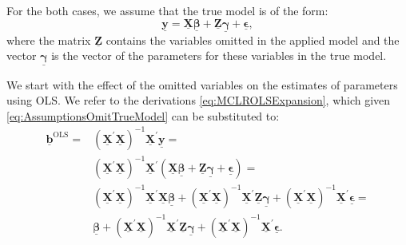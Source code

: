 \documentclass[
]{book}
\begin{document}
For the both cases, we assume that the true model is of the form:
\begin{equation}
    \underline{\mathbf{y}} = \underline{\mathbf{X}} \underline{\boldsymbol{\beta}} + \underline{\mathbf{Z}} \underline{\boldsymbol{\gamma}} + \underline{\boldsymbol{\epsilon}},
    \label{eq:AssumptionsOmitTrueModel}
\end{equation}
where the matrix \(\underline{\mathbf{Z}}\) contains the variables omitted in the applied model and the vector \(\underline{\boldsymbol{\gamma}}\) is the vector of the parameters for these variables in the true model.

We start with the effect of the omitted variables on the estimates of parameters using OLS. We refer to the derivations \eqref{eq:MCLROLSExpansion}, which given \eqref{eq:AssumptionsOmitTrueModel} can be substituted to:
\begin{equation}
    \begin{aligned}
    \underline{\boldsymbol{b}}^{\text{OLS}} =
        & \left( \underline{\mathbf{X}}^\prime \underline{\mathbf{X}} \right)^{-1} \underline{\mathbf{X}}^\prime \underline{\mathbf{y}} = \\
        & \left( \underline{\mathbf{X}}^\prime \underline{\mathbf{X}} \right)^{-1} \underline{\mathbf{X}}^\prime \left(\underline{\mathbf{X}} \underline{\boldsymbol{\beta}} + \underline{\mathbf{Z}} \underline{\boldsymbol{\gamma}} + \underline{\boldsymbol{\epsilon}} \right) = \\
        & \left( \underline{\mathbf{X}}^\prime \underline{\mathbf{X}} \right)^{-1} \underline{\mathbf{X}}^\prime \underline{\mathbf{X}} \underline{\boldsymbol{\beta}} + \left( \underline{\mathbf{X}}^\prime \underline{\mathbf{X}} \right)^{-1} \underline{\mathbf{X}}^\prime \underline{\mathbf{Z}} \underline{\boldsymbol{\gamma}} + \left( \underline{\mathbf{X}}^\prime \underline{\mathbf{X}} \right)^{-1} \underline{\mathbf{X}}^\prime \underline{\boldsymbol{\epsilon}} = \\
        & \underline{\boldsymbol{\beta}} + \left( \underline{\mathbf{X}}^\prime \underline{\mathbf{X}} \right)^{-1} \underline{\mathbf{X}}^\prime \underline{\mathbf{Z}} \underline{\boldsymbol{\gamma}} + \left( \underline{\mathbf{X}}^\prime \underline{\mathbf{X}} \right)^{-1} \underline{\mathbf{X}}^\prime \underline{\boldsymbol{\epsilon}} .
    \end{aligned}
    \label{eq:AssumptionsOmitOLS01}
\end{equation}
\end{document}
